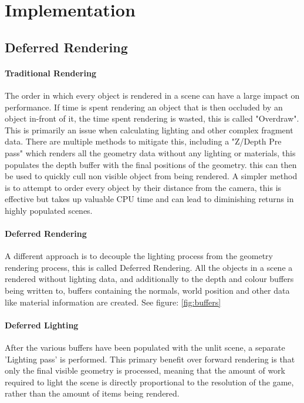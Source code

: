\documentclass[conference]{acmsiggraph}
\begin{document}
\section{Implementation}
\subsection{Deferred Rendering}

\paragraph{Traditional Rendering}
The order in which every object is rendered in a scene can have a large impact on performance. If time is spent rendering an object that is then occluded by an object in-front of it, the time spent rendering is wasted, this is called "Overdraw". This is primarily an issue when calculating lighting and other complex fragment data. There are multiple methods to mitigate this, including a "Z/Depth Pre pass" which renders all the geometry data without any lighting or materials, this populates the depth buffer with the final positions of the geometry. this can then be used to quickly cull non visible object from being rendered. A simpler method is to attempt to order every object by their distance from the camera, this is effective but takes up valuable CPU time and can lead to diminishing returns in highly populated scenes.

\paragraph{Deferred Rendering}
A different approach is to decouple the lighting process from the geometry rendering process, this is called Deferred Rendering. All the objects in a scene a rendered without  lighting data, and additionally to the depth and colour buffers being written to, buffers containing the normals, world position and other data like material information are created. See figure: \ref{fig:buffers}

\paragraph{Deferred Lighting}
After the various buffers have been populated with the unlit scene, a separate 'Lighting pass' is performed. This primary benefit over forward rendering is that only the final visible geometry is processed, meaning that the amount of work required to light the scene is directly proportional to the resolution of the game, rather than the amount of items being rendered.
\end{document}
